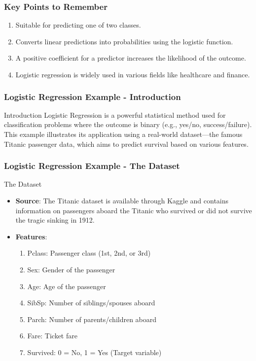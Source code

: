 \documentclass[aspectratio=169]{beamer}
\begin{document}
\begin{frame}[fragile]
    \frametitle{Key Points to Remember}
    \begin{enumerate}
        \item Suitable for predicting one of two classes.
        \item Converts linear predictions into probabilities using the logistic function.
        \item A positive coefficient for a predictor increases the likelihood of the outcome.
        \item Logistic regression is widely used in various fields like healthcare and finance.
    \end{enumerate}
\end{frame}

\begin{frame}[fragile]
    \frametitle{Logistic Regression Example - Introduction}
    \begin{block}{Introduction}
        Logistic Regression is a powerful statistical method used for classification problems where the outcome is binary (e.g., yes/no, success/failure). 
        This example illustrates its application using a real-world dataset—the famous Titanic passenger data, which aims to predict survival based on various features.
    \end{block}
\end{frame}

\begin{frame}[fragile]
    \frametitle{Logistic Regression Example - The Dataset}
    \begin{block}{The Dataset}
        \begin{itemize}
            \item \textbf{Source}: The Titanic dataset is available through Kaggle and contains information on passengers aboard the Titanic who survived or did not survive the tragic sinking in 1912.
            \item \textbf{Features}:
            \begin{enumerate}
                \item Pclass: Passenger class (1st, 2nd, or 3rd)
                \item Sex: Gender of the passenger
                \item Age: Age of the passenger
                \item SibSp: Number of siblings/spouses aboard
                \item Parch: Number of parents/children aboard
                \item Fare: Ticket fare
                \item Survived: 0 = No, 1 = Yes (Target variable)
            \end{enumerate}
        \end{itemize}
    \end{block}
\end{frame}
\end{document}
